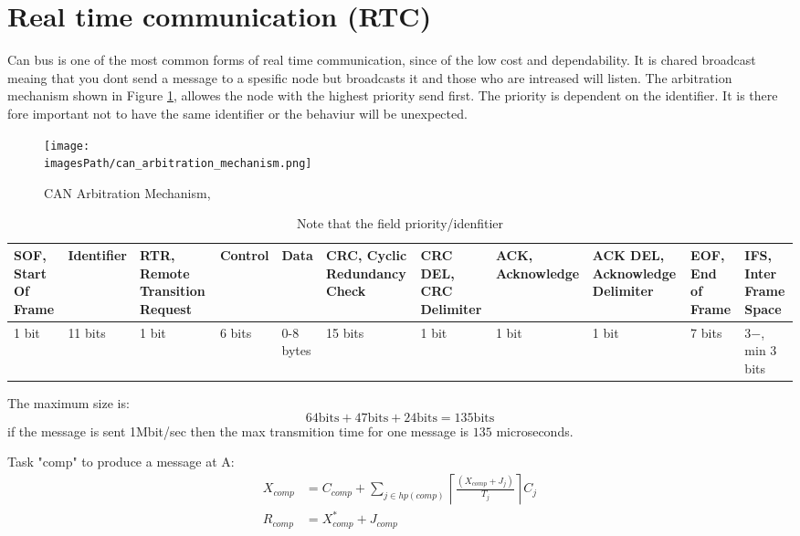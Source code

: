 \section{Real time communication (RTC)}
Can bus is one of the most common forms of real time communication, since of the low cost and dependability.
It is chared broadcast meaing that you dont send a message to a spesific node but broadcasts it and those who are intreased will listen.
The arbitration mechanism shown in Figure \ref{can_arbitration_mechanism}, allowes the node with the highest priority send first.
The priority is dependent on the identifier. It is there fore important not to have the same identifier or the behaviur will be unexpected.
\begin{figure}[H]
    \centering
    \texttt{[image: \\imagesPath/can\_arbitration\_mechanism.png]}
    \caption{CAN Arbitration Mechanism, \cite{14-rtc, p.11}}
    \label{can_arbitration_mechanism}
\end{figure}


\begin{table}[H]
  \centering
\begin{tabular}{ |p{1cm}|p{1.4cm}|p{1cm}|p{1.1cm}|p{1cm}|p{1cm}|p{1cm}|p{1cm}|p{1cm}|p{1cm}|p{1cm}| } 
  \hline
  SOF, Start Of Frame & 
  Identifier &
  RTR, Remote Transition Request &
  Control &
  Data &
  CRC, Cyclic Redundancy Check &
  CRC DEL, CRC Delimiter &
  ACK, Acknowledge &
  ACK DEL, Acknowledge Delimiter &
  EOF, End of Frame &
  IFS, Inter Frame Space \\
  \hline
  1 bit & 
  11 bits &
  1 bit &
  6 bits &
  0-8 bytes &
  15 bits &
  1 bit &
  1 bit &
  1 bit &
  7 bits &
  3$-$, min 3 bits \\
  \hline
\end{tabular}
  \caption{Note that the field priority/idenfitier}
\end{table}

The maximum size is:
\begin{equation*}
  64 \text{bits} + 47 \text{bits} + 24 \text{bits} = 135 \text{bits}
\end{equation*}
if the message is sent 1Mbit/sec then the max transmition time for one message is $135$ microseconds.

Task "comp" to produce a message at A:
\begin{align*}
  X_{comp} &= C_{comp} + \sum_{j\in hp(comp)} \left\lceil \frac{(X_{comp} + J_j)}{T_j} \right\rceil C_j \\ 
  R_{comp} &= X_{comp}^* + J_{comp}
\end{align*}

